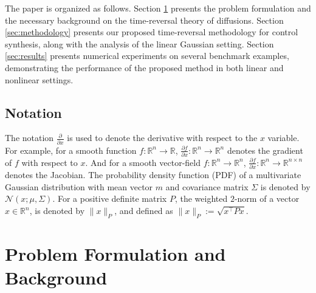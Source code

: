 \documentclass[letterpaper, 10 pt, conference]{ieeeconf}  %
\newcommand{\at}[1]{{\color{blue} #1}}
\def\Re{\mathbb{R}}
\def\R{\mathbb{R}}
\newcommand{\field}[1]{\mathbb{#1}}
\def\Re{\field{R}}
\def\R{\mathbb{R}}
\newcommand{\ud}{\,\mathrm{d}}
\def\Re{\mathbb{R}}
\renewcommand{\Re}{\mathbb{R}}
\begin{document}
The paper is organized as follows. Section \ref{sec:problem_formulation} presents the problem formulation and the necessary background on the time-reversal theory of diffusions. Section \ref{sec:methodology} presents our proposed  time-reversal methodology for control synthesis, along with the analysis of the linear Gaussian setting. Section \ref{sec:results} presents numerical experiments on several benchmark examples, demonstrating the performance of the proposed method in both linear and nonlinear settings. 


\subsection{Notation}
The notation $\frac{\partial}{\partial x}$ is used to denote the derivative with respect to the $x$ variable. For example, for a smooth function $f:\R^n \to \Re$,  $\frac{\partial f}{\partial x}:\R^n\to \R^n$ denotes the gradient of $f$ with respect to $x$. And for a smooth vector-field $f:\R^n \to \Re^n$,  $\frac{\partial f}{\partial x}:\R^n\to \R^{n\times n}$ denotes the Jacobian.  The probability density function (PDF) of a multivariate Gaussian distribution with mean vector  $m$ and covariance matrix $\Sigma$ is denoted by $\mathcal{N}(x;\mu,\Sigma)$. For a positive definite matrix $P$, the weighted $2$-norm of a vector $x \in \R^n$, is denoted by $\|x\|_P$, and defined as $\|x\|_P := \sqrt{x^\top Px}$.





    
    \section{Problem Formulation and Background}\label{sec:problem_formulation}
\end{document}
